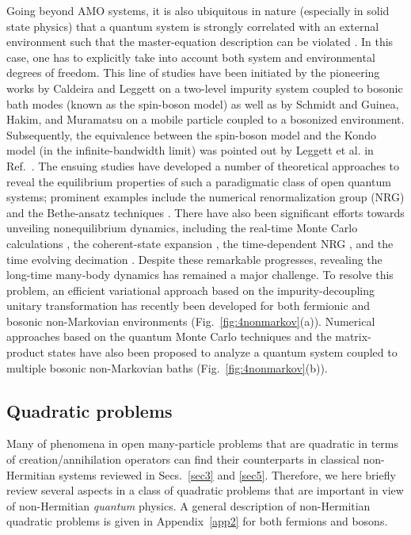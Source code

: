 \documentclass{tADP2e}
\theoremstyle{plain}
\theoremstyle{plain}
\theoremstyle{definition}
\begin{document}
Going beyond AMO systems, it is also ubiquitous in nature (especially in solid state physics) that a quantum system is strongly correlated with an external environment such that the master-equation description can be violated \cite{UW99}. 
In this case, one has to explicitly take into account both system and environmental degrees of freedom. This line of studies have been initiated by the pioneering works by Caldeira and Leggett on a two-level impurity system coupled to bosonic bath modes (known as the spin-boson model) \cite{CAO81} as well as by Schmidt \cite{SA83} and Guinea, Hakim, and Muramatsu  \cite{GF85} on a mobile particle coupled to a bosonized environment. Subsequently, the equivalence between the spin-boson model and the Kondo model (in the infinite-bandwidth limit) was pointed out by Leggett et al. in Ref.~\cite{LAJ87}. The ensuing studies have developed a number of theoretical approaches to reveal the equilibrium properties of such a paradigmatic class of open quantum systems; prominent examples include the numerical renormalization group (NRG) \cite{WKG75,BR03,BCA10} and the Bethe-ansatz techniques  \cite{NK81,AN83,SP89}.  There have also been significant efforts towards unveiling nonequilibrium dynamics, including the real-time Monte Carlo  calculations \cite{STL08,WP09d,SM09,WP10,CG13}, the coherent-state expansion \cite{BS14,FS15,BCZ17}, the time-dependent NRG \cite{AFB05,LB14}, and the time evolving decimation \cite{NM15,DB17}. Despite these remarkable progresses, revealing the long-time many-body dynamics has remained a major challenge. To resolve this problem, an efficient variational approach based on the impurity-decoupling unitary transformation has recently been developed for both fermionic and bosonic non-Markovian environments \cite{YA18L,YA18B,YA19L,YA19A} (Fig.~\ref{fig:4nonmarkov}(a)).  Numerical approaches based on the quantum Monte Carlo techniques \cite{CZ14,YZ18} and the matrix-product states \cite{dVA15,TC20} have also been proposed to analyze a quantum system coupled to multiple bosonic non-Markovian baths  (Fig.~\ref{fig:4nonmarkov}(b)).


\subsection{Quadratic problems}\label{Sec:QP}
Many of phenomena in open many-particle problems that are quadratic in terms of creation/annihilation operators can find their counterparts in classical non-Hermitian systems reviewed in Secs.~\ref{sec3} and \ref{sec5}. Therefore,  we here  briefly review several aspects in a class of quadratic problems that are important in view of non-Hermitian {\it quantum} physics. A general description of non-Hermitian quadratic problems is given in Appendix~\ref{app2} for both fermions and bosons.
\end{document}
